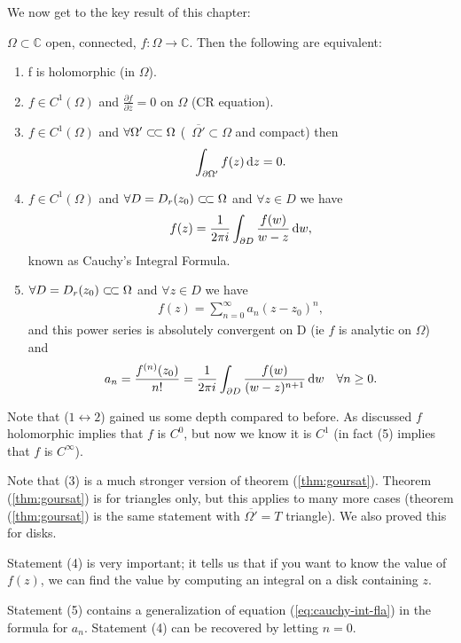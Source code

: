 We now get to the key result of this chapter:

\begin{theorem}\label{thm:cauchy-theorem}
$\Omega \subset \mathbb{C}$ open, connected, $f:\Omega \rightarrow \mathbb{C}$. Then the following are equivalent:
\begin{enumerate}
    \item f is holomorphic (in $\Omega$).
    \item $f\in C^1(\Omega)$ and $\frac{\partial f}{\partial \overline{z}} = 0$ on $\Omega$ (CR equation).
    \item $f\in C^1(\Omega)$ and $\forall \Omega' \ssubset \Omega$ (\, $\overline{\Omega'} \subset \Omega$ and compact) then
    \begin{align*}
        \int_{\partial \Omega'} f(z) \dif z = 0.
    \end{align*}
    \item $f\in C^1(\Omega)$ and $\forall D = D_r(z_0) \ssubset \Omega$ and $\forall z\in D$ we have 
    \begin{align}\label{eq:cauchy-int-fla}
        f(z) = \frac{1}{2\pi i} \int_{\partial D} \frac{f(w)}{w-z}  \dif w,
    \end{align}
     known as Cauchy's Integral Formula.
    \item $\forall D = D_r(z_0) \ssubset \Omega$ and $\forall z\in D$ we have
    \begin{align*}
        f(z) = \sum_{n=0}^\infty a_n (z-z_0)^n,
    \end{align*}
    and this power series is absolutely convergent on D (ie $f$ is analytic on $\Omega$) and
    \begin{align*}
        a_n &= \frac{f^{(n)}(z_0) }{n!} = \frac{1}{2\pi i} \int_{\partial D} \frac{f(w)}{(w-z)^{n+1}}  \dif w &\forall n \geq 0.
    \end{align*}
\end{enumerate}
\end{theorem}





\begin{note}
Note that ($1 \leftrightarrow 2$) gained us some depth compared to before. As discussed $f$ holomorphic implies that $f$ is $C^0$, but now we know it is $C^1$ (in fact (5) implies that $f$ is $C^\infty$).

Note that (3) is a much stronger version of theorem (\ref{thm:goursat}). Theorem (\ref{thm:goursat}) is for triangles only, but this applies to many more cases (theorem (\ref{thm:goursat}) is the same statement with $\overline{\Omega'}=T$ triangle). We also proved this for disks.

Statement (4) is very important; it tells us that if you want to know the value of $f(z)$, we can find the value by computing an integral on a disk containing $z$.

Statement (5) contains a generalization of equation (\ref{eq:cauchy-int-fla}) in the formula for $a_n$. Statement (4) can be recovered by letting $n=0$.
\end{note}



